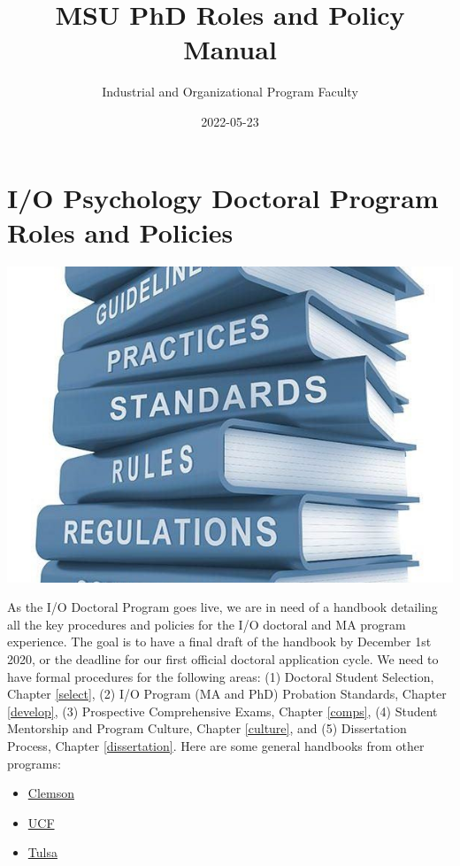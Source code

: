 \documentclass[
]{book}
\title{MSU PhD Roles and Policy Manual}
\author{Industrial and Organizational Program Faculty}
\date{2022-05-23}
\providecommand{\tightlist}{%
  \setlength{\itemsep}{0pt}\setlength{\parskip}{0pt}}
\begin{document}
\maketitle

{
\setcounter{tocdepth}{1}
\tableofcontents
}
\hypertarget{io-psychology-doctoral-program-roles-and-policies}{%
\chapter{I/O Psychology Doctoral Program Roles and Policies}\label{io-psychology-doctoral-program-roles-and-policies}}

\includegraphics{manual.png}

As the I/O Doctoral Program goes live, we are in need of a handbook detailing all the key procedures and policies for the I/O doctoral and MA program experience. The goal is to have a final draft of the handbook by December 1st 2020, or the deadline for our first official doctoral application cycle. We need to have formal procedures for the following areas: (1) Doctoral Student Selection, Chapter \ref{select}, (2) I/O Program (MA and PhD) Probation Standards, Chapter \ref{develop}, (3) Prospective Comprehensive Exams, Chapter \ref{comps}, (4) Student Mentorship and Program Culture, Chapter \ref{culture}, and (5) Dissertation Process, Chapter \ref{dissertation}. Here are some general handbooks from other programs:

\begin{itemize}
\tightlist
\item
  \href{https://www.clemson.edu/cbshs/departments/psychology/files/pdf/handbook-psychology-graduate-current.pdf}{Clemson}
\item
  \href{https://graduate.ucf.edu/wp-content/uploads/2019/05/Industrial-and-Organizational-Psychology-PhD.pdf}{UCF}
\item
  \href{https://artsandsciences.utulsa.edu/wp-content/uploads/sites/6/2015/09/2017-I-O-Handbook.pdf}{Tulsa}
\end{itemize}
\end{document}
